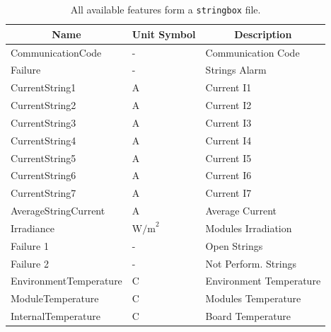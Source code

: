 \begin{table}[H]
	\begin{center}
		\begin{tabular}[c]{l|l|l}
			\hline
			\multicolumn{1}{c|}{\textbf{Name}}        &
			\multicolumn{1}{c|}{\textbf{Unit Symbol}} &
			\multicolumn{1}{c}{\textbf{Description}}                                             \\
			\hline
			CommunicationCode                         & -              & Communication Code      \\
			Failure                                   & -              & Strings Alarm           \\
			CurrentString1                            & A              & Current I1              \\
			CurrentString2                            & A              & Current I2              \\
			CurrentString3                            & A              & Current I3              \\
			CurrentString4                            & A              & Current  I4             \\
			CurrentString5                            & A              & Current I5              \\
			CurrentString6                            & A              & Current I6              \\
			CurrentString7                            & A              & Current I7              \\
			AverageStringCurrent                      & A              & Average Current         \\
			Irradiance                                & $\text{W/m}^2$ & Modules Irradiation     \\
			Failure 1                                 & -              & Open Strings            \\
			Failure 2                                 & -              & Not Perform. Strings    \\
			EnvironmentTemperature                    & C              & Environment Temperature \\
			ModuleTemperature                         & C              & Modules Temperature     \\
			InternalTemperature                       & C              & Board Temperature       \\
			\hline
		\end{tabular}
		\caption{All available features form a \texttt{stringbox} file.}\label{tab:junctionfeatures}
	\end{center}
\end{table}


